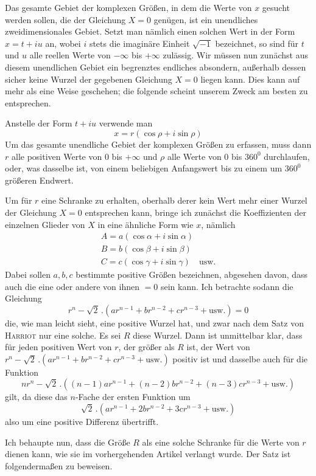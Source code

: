 Das gesamte Gebiet der komplexen Größen, in dem die Werte von $x$ gesucht werden sollen, die der Gleichung $X=0$ genügen, ist ein unendliches zweidimensionales Gebiet. Setzt man nämlich einen solchen Wert in der Form $x=t+iu$ an, wobei $i$ stets die imaginäre Einheit $\surd{-1}$ bezeichnet, so sind für $t$ und $u$ alle reellen Werte von $-\infty$ bis $+\infty$ zulässig. Wir müssen nun zunächst aus diesem unendlichen Gebiet ein begrenztes endliches absondern, außerhalb dessen sicher keine Wurzel der gegebenen Gleichung $X=0$ liegen kann. Dies kann auf mehr als eine Weise geschehen; die folgende scheint unserem Zweck am besten zu entsprechen.

Anstelle der Form $t+iu$ verwende man
\[
x=r(\cos\rho+i\sin\rho)
\]
Um das gesamte unendliche Gebiet der komplexen Größen zu erfassen, muss dann $r$ alle positiven Werte von $0$ bis $+\infty$ und $\rho$ alle Werte von $0$ bis $360^0$ durchlaufen, oder, was
dasselbe ist, von einem beliebigen Anfangswert bis zu einem um $360^0$ größeren Endwert.

Um für $r$ eine Schranke zu erhalten, oberhalb derer kein Wert mehr einer Wurzel der Gleichung $X=0$ entsprechen kann, bringe ich zunächst die Koeffizienten der einzelnen Glieder von $X$ in eine ähnliche Form wie $x$, nämlich
\[
\begin{array}{l}
A=a(\cos\alpha+i\sin\alpha)\\
B=b(\cos\beta+i\sin\beta)\\
C=c(\cos\gamma+i\sin\gamma)\quad\mbox{usw.}
\end{array}
\]
Dabei sollen $a,b,c$ bestimmte positive Größen bezeichnen, abgesehen davon, dass auch die eine oder andere von ihnen $=0$ sein kann. Ich betrachte sodann die Gleichung
\[
r^n-\surd2\,.(ar^{n-1}+br^{n-2}+cr^{n-3}+\mbox{usw.})=0
\]
die, wie man leicht sieht, eine positive Wurzel hat, und zwar nach dem Satz von \textsc{Harriot} nur eine solche. Es sei $R$ diese Wurzel. Dann ist unmittelbar klar, dass für jeden positiven Wert von $r$, der größer als $R$ ist, der Wert von
$r^n-\surd2\,.(ar^{n-1}+br^{n-2}+cr^{n-3}+\mbox{usw.})$
positiv ist und dasselbe auch für die Funktion
\[
nr^n-\surd2\,.((n-1)ar^{n-1}+(n-2)br^{n-2}+(n-3)cr^{n-3}+\mbox{usw.})
\]
gilt, da diese das $n$-Fache der ersten Funktion um
\[
\surd2\,.(ar^{n-1}+2br^{n-2}+3cr^{n-3}+\mbox{usw.})
\]
also um eine positive Differenz übertrifft.

Ich behaupte nun, dass die Größe $R$ als eine solche Schranke für die Werte von $r$ dienen kann, wie sie im vorhergehenden Artikel verlangt wurde. Der Satz ist folgendermaßen zu beweisen.

